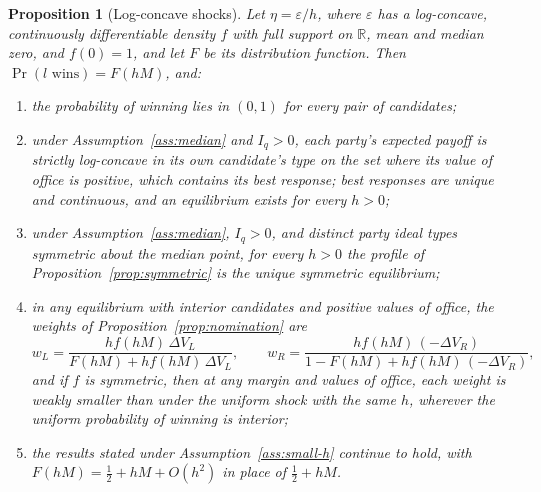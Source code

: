 \documentclass[12pt,letterpaper]{article}
\newtheorem{proposition}{Proposition}
\begin{document}
\begin{proposition}[Log-concave shocks]\label{prop:logconcave}
Let $\eta=\varepsilon/h$, where $\varepsilon$ has a log-concave, continuously differentiable density $f$ with full support on $\mathbb{R}$, mean and median zero, and $f(0)=1$, and let $F$ be its distribution function. Then $\Pr(l\text{ wins})=F(hM)$, and:
\begin{enumerate}
  \item[(a)] the probability of winning lies in $(0,1)$ for every pair of candidates;
  \item[(b)] under Assumption~\ref{ass:median} and $I_q>0$, each party's expected payoff is strictly log-concave in its own candidate's type on the set where its value of office is positive, which contains its best response; best responses are unique and continuous, and an equilibrium exists for every $h>0$;
  \item[(c)] under Assumption~\ref{ass:median}, $I_q>0$, and distinct party ideal types symmetric about the median point, for every $h>0$ the profile of Proposition~\ref{prop:symmetric} is the unique symmetric equilibrium;
  \item[(d)] in any equilibrium with interior candidates and positive values of office, the weights of Proposition~\ref{prop:nomination} are
  \[
  w_L=\frac{hf(hM)\,\Delta V_L}{F(hM)+hf(hM)\,\Delta V_L},
  \qquad
  w_R=\frac{hf(hM)\,(-\Delta V_R)}{1-F(hM)+hf(hM)\,(-\Delta V_R)},
  \]
  and if $f$ is symmetric, then at any margin and values of office, each weight is weakly smaller than under the uniform shock with the same $h$, wherever the uniform probability of winning is interior;
  \item[(e)] the results stated under Assumption~\ref{ass:small-h} continue to hold, with $F(hM)=\tfrac12+hM+O(h^2)$ in place of $\tfrac12+hM$.
\end{enumerate}
\end{proposition}
\end{document}
